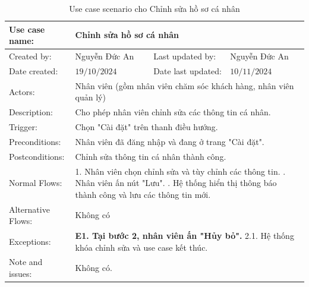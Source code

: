 \begin{table}[H]
	\centering
	\begin{tabular}{|l|l|l|l|} 
		\hline Use case name: & \multicolumn{3}{|l|}{Chỉnh sửa hồ sơ cá nhân} \\ 
		\hline Created by: & Nguyễn Đức An & Last updated by: & Nguyễn Đức An \\ 
		\hline Date created: & $19 / 10 / 2024$ & Date last updated: & $10 / 11 / 2024$\\ 
		\hline Actors: & \multicolumn{3}{|p{12cm}|}{Nhân viên (gồm nhân viên chăm sóc khách hàng, nhân viên quản lý)} \\ 
		\hline Description: & \multicolumn{3}{|p{12cm}|}{ Cho phép nhân viên chỉnh sửa các thông tin cá nhân. } \\ 
		\hline Trigger: & \multicolumn{3}{|p{12cm}|}{Chọn "Cài đặt" trên thanh điều hướng. } \\ 
		\hline Preconditions: & \multicolumn{3}{|p{12cm}|}{ Nhân viên đã đăng nhập và đang ở trang "Cài đặt". } \\ 
		\hline Postconditions: & \multicolumn{3}{|p{12cm}|}{ Chỉnh sửa thông tin cá nhân thành công. } \\ 
		\hline Normal Flows: & \multicolumn{3}{|p{12cm}|}{ 
			1. Nhân viên chọn chỉnh sửa và tùy chỉnh các thông tin. \newline 
			2. Nhân viên ấn nút "Lưu". \newline 
			3. Hệ thống hiển thị thông báo thành công và lưu các thông tin mới. 
		} \\ 
		\hline Alternative Flows: & \multicolumn{3}{|p{12cm}|}{ Không có
		} \\ 
		\hline Exceptions: & \multicolumn{3}{|p{12cm}|}{ 
			\textbf{E1. Tại bước 2, nhân viên ấn "Hủy bỏ".} \newline 
			\hspace{0.5cm}2.1. Hệ thống khóa chỉnh sửa và use case kết thúc. 
		} \\ 
		\hline Note and issues: & \multicolumn{3}{|p{12cm}|}{ Không có. } \\ 
		\hline
	\end{tabular}
	\caption{Use case scenario cho Chỉnh sửa hồ sơ cá nhân}
\end{table}

